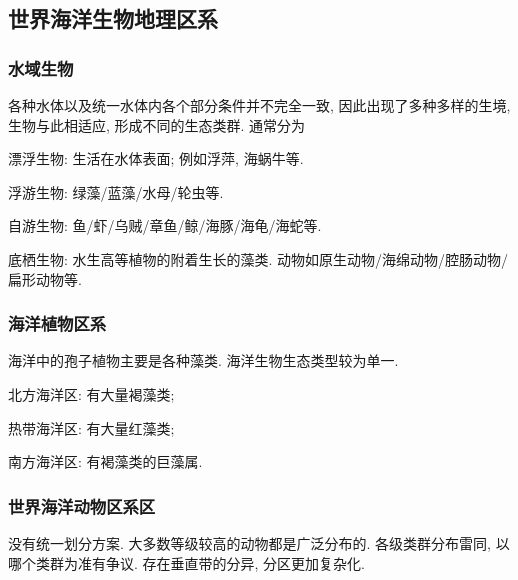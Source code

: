 \documentclass{ctexart}
\begin{document}


\subsection{世界海洋生物地理区系} %
\label{sub:世界海洋生物地理区系}

\subsubsection{水域生物} %
\label{ssub:水域生物}

各种水体以及统一水体内各个部分条件并不完全一致, 因此出现了多种多样的生境, 生物与此相适应, 形成不同的生态类群. 通常分为
\begin{cenum}
    \item 漂浮生物: 生活在水体表面; 例如浮萍, 海蜗牛等.
    \item 浮游生物: 绿藻/蓝藻/水母/轮虫等.
    \item 自游生物: 鱼/虾/乌贼/章鱼/鲸/海豚/海龟/海蛇等.
    \item 底栖生物: 水生高等植物的附着生长的藻类. 动物如原生动物/海绵动物/腔肠动物/扁形动物等.
\end{cenum}


\subsubsection{海洋植物区系} %
\label{ssub:海洋植物区系}

海洋中的孢子植物主要是各种藻类. 海洋生物生态类型较为单一.

\begin{cenum}
    \item 北方海洋区: 有大量褐藻类;
    \item 热带海洋区: 有大量红藻类;
    \item 南方海洋区: 有褐藻类的巨藻属.
\end{cenum}


\subsubsection{世界海洋动物区系区} %
\label{ssub:世界海洋动物区系区}

没有统一划分方案. 大多数等级较高的动物都是广泛分布的. 各级类群分布雷同, 以哪个类群为准有争议. 存在垂直带的分异, 分区更加复杂化.
\end{document}
